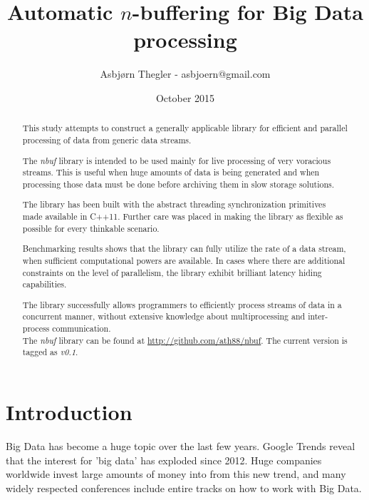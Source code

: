 \documentclass[a4paper]{article}
\title{Automatic $n$-buffering for Big Data processing}
\author{Asbj\o rn Thegler - asbjoern@gmail.com}
\date{October 2015}
\newcommand{\nbuf}{\textit{nbuf} }
\begin{document}
\maketitle

\sloppy

\begin{abstract}
\begin{doublespace}
This study attempts to construct a generally applicable library for efficient and parallel processing of data from generic data streams.

The \nbuf library is intended to be used mainly for live processing of very voracious streams. This is useful when huge amounts of data is being generated and when processing those data must be done before archiving them in slow storage solutions.

The library has been built with the abstract threading synchronization primitives made available in C++11. Further care was placed in making the library as flexible as possible for every thinkable scenario.

Benchmarking results shows that the library can fully utilize the rate of a data stream, when sufficient computational powers are available. In cases where there are additional constraints on the level of parallelism, the library exhibit brilliant latency hiding capabilities.

The library successfully allows programmers to efficiently process streams of data in a concurrent manner, without extensive knowledge about multiprocessing and inter-process communication.\\

The \nbuf library can be found at \url{http://github.com/ath88/nbuf}. The current version is tagged as \textit{v0.1}.

\end{doublespace}
\end{abstract}

\newpage
\tableofcontents

\newpage
{}
\section{Introduction}
Big Data has become a huge topic over the last few years. Google Trends reveal that the interest for 'big data' has exploded since 2012. Huge companies worldwide invest large amounts of money into from this new trend\cite{bigdatainvest}, and many widely respected conferences include entire tracks on how to work with Big Data.\\
\end{document}
